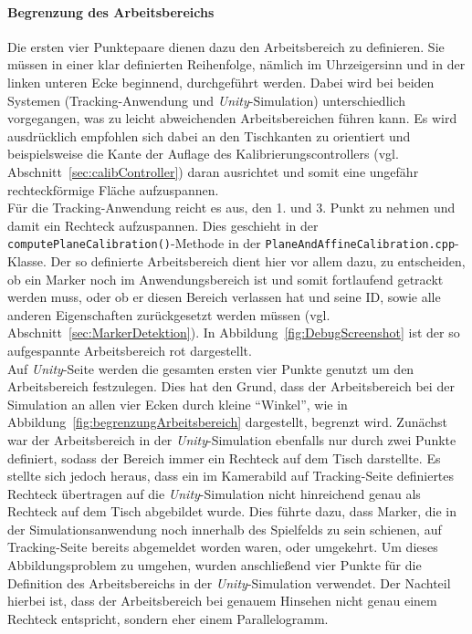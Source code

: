 \paragraph{Begrenzung des Arbeitsbereichs} Die ersten vier Punktepaare dienen dazu den Arbeitsbereich zu definieren. Sie müssen in einer klar definierten Reihenfolge, nämlich im Uhrzeigersinn und in der linken unteren Ecke beginnend, durchgeführt werden. Dabei wird bei beiden Systemen (Tracking-Anwendung und \emph{Unity}-Simulation) unterschiedlich vorgegangen, was zu leicht abweichenden Arbeitsbereichen führen kann. Es wird ausdrücklich empfohlen sich dabei an den Tischkanten zu orientiert und beispielsweise die Kante der Auflage des Kalibrierungscontrollers (vgl. Abschnitt~\ref{sec:calibController}) daran ausrichtet und somit eine ungefähr rechteckförmige Fläche aufzuspannen.\\
Für die Tracking-Anwendung reicht es aus, den 1. und 3. Punkt zu nehmen und damit ein Rechteck aufzuspannen. Dies geschieht in der \texttt{compute\-Plane\-Cali\-bration()}-Methode in der \texttt{Plane\-And\-Affine\-Calibration.cpp}-Klasse. Der so definierte Arbeitsbereich dient hier vor allem dazu, zu entscheiden, ob ein Marker noch im Anwendungsbereich ist und somit fortlaufend getrackt werden muss, oder ob er diesen Bereich verlassen hat und seine ID, sowie alle anderen Eigenschaften zurückgesetzt werden müssen (vgl. Abschnitt~\ref{sec:MarkerDetektion}). In Abbildung~\ref{fig:DebugScreenshot} ist der so aufgespannte Arbeitsbereich rot dargestellt.\\
Auf \emph{Unity}-Seite werden die gesamten ersten vier Punkte genutzt um den Arbeitsbereich festzulegen. Dies hat den Grund, dass der Arbeitsbereich bei der Simulation an allen vier Ecken durch kleine "`Winkel"', wie in Abbildung~\ref{fig:begrenzungArbeitsbereich} dargestellt, begrenzt wird. Zunächst war der Arbeitsbereich in der \emph{Unity}-Simulation ebenfalls nur durch zwei Punkte definiert, sodass der Bereich immer ein Rechteck auf dem Tisch darstellte. Es stellte sich jedoch heraus, dass ein im Kamerabild auf Tracking-Seite definiertes Rechteck übertragen auf die \emph{Unity}-Simulation nicht hinreichend genau als Rechteck auf dem Tisch abgebildet wurde. Dies führte dazu, dass Marker, die in der Simulationsanwendung noch innerhalb des Spielfelds zu sein schienen, auf Tracking-Seite bereits abgemeldet worden waren, oder umgekehrt. Um dieses Abbildungsproblem zu umgehen, wurden anschließend vier Punkte für die Definition des Arbeitsbereichs in der \emph{Unity}-Simulation verwendet. Der Nachteil hierbei ist, dass der Arbeitsbereich bei genauem Hinsehen nicht genau einem Rechteck entspricht, sondern eher einem Parallelogramm.


